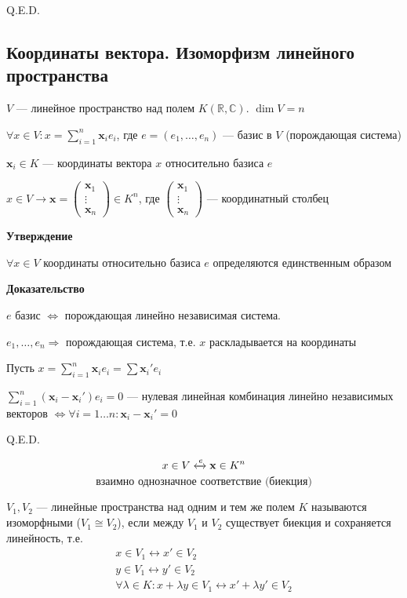 \hfill Q.E.D.

\subsection{Координаты вектора. Изоморфизм линейного пространства}

\(V\) --- линейное пространство над полем \(K (\mathbb{R}, \mathbb{C})\). \(\dim V = n\)

\(\forall x \in V: x = \sum\limits_{i = 1}^{n} \mathbf{x}_i e_i\), где \(e = (e_1, \ldots, e_n)\) --- базис в \(V\) (порождающая система)

\(\mathbf{x}_i \in K\) --- координаты вектора \(x\) относительно базиса \(e\)

\(x \in V \longrightarrow \mathbf{x} =
\begin{pmatrix}
    \mathbf{x}_{1}  \\
    \vdots \\
    \mathbf{x}_{n}
\end{pmatrix} \in K^n\), где \(
\begin{pmatrix}
    \mathbf{x}_{1}  \\
    \vdots \\
    \mathbf{x}_{n}
\end{pmatrix}
\) --- координатный столбец

\textbf{Утверждение}

\(\forall x \in V\) координаты относительно базиса \(e\) определяются единственным образом

\textbf{Доказательство}

$e$ базис $\Leftrightarrow$ порождающая линейно независимая система.

\(e_1, \ldots, e_n \Rightarrow\) порождающая система, т.е. \(x\) раскладывается на координаты

Пусть \(x = \sum\limits_{i = 1}^{n} \mathbf{x}_i e_i = \sum\limits \mathbf{x}_i' e_i\)

\(\sum\limits_{i = 1}^{n} (\mathbf{x}_i - \mathbf{x}_i') e_i = 0\) --- нулевая линейная комбинация линейно независимых векторов \(\Leftrightarrow \forall i = 1 \ldots n: \mathbf{x}_i - \mathbf{x}_i' = 0\)

\hfill Q.E.D.

\[
    x \in V \xleftrightarrow{e} \mathbf{x} \in K^n \\
\]
\[
    \text{взаимно однозначное соответствие (биекция)}
\]

\(V_1, V_2\) --- линейные пространства над одним и тем же полем $K$ называются изоморфными (\(V_1 \cong V_2\)), если между \(V_1\) и \(V_2\) существует биекция и сохраняется линейность, т.е.
\begin{gather*}
    x \in V_1 \longleftrightarrow x' \in V_2 \\
    y \in V_1 \longleftrightarrow y' \in V_2 \\
    \forall \lambda \in K: x + \lambda y \in V_1 \longleftrightarrow x' + \lambda y' \in V_2
\end{gather*}

